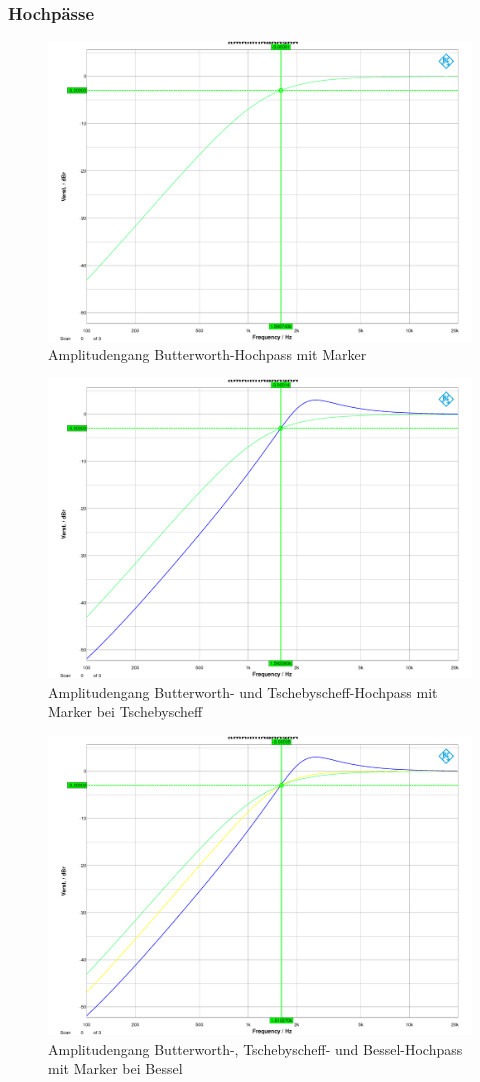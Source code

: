 \newpage
\newpage

\subsubsection{Hochpässe}

\begin{figure}[h]
\centering
\includegraphics[width=0.60\linewidth]{Bilder/ImLabor/Amplitudengang_1_1_Butter_HP}
\caption{Amplitudengang Butterworth-Hochpass mit Marker}
\label{fig:Amplitudengang_1_1_Butter_HP}
\end{figure}

\begin{figure}[h]
\centering
\includegraphics[width=0.60\linewidth]{Bilder/ImLabor/Amplitudengang_1_2_Tscheby_HP}
\caption{Amplitudengang Butterworth- und Tschebyscheff-Hochpass mit Marker bei Tschebyscheff}
\label{fig:Amplitudengang_1_2_Tscheby_HP}
\end{figure}

\begin{figure}[h]
\centering
\includegraphics[width=0.60\linewidth]{Bilder/ImLabor/Amplitudengang_1_3_Bessel_HP_Alle}
\caption{Amplitudengang Butterworth-, Tschebyscheff- und Bessel-Hochpass mit Marker bei Bessel}
\label{fig:Amplitudengang_1_3_Bessel_HP_Alle}
\end{figure}

